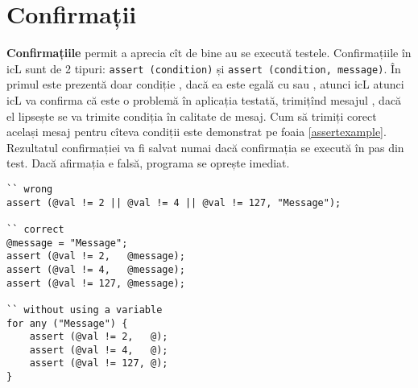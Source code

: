 \section{Confirmații}

{\bf Confirmațiile} permit a aprecia cît de bine au se execută testele. Confirmațiile în icL sunt de 2 tipuri: \lstinline|assert (condition)| și \lstinline|assert (condition, message)|. În primul este prezentă doar condiție , dacă ea este egală cu \false{} sau \void, atunci icL atunci icL va confirma că este o problemă în aplicația testată, trimițînd mesajul , dacă el lipsește se va trimite condiția în calitate de mesaj. Cum să trimiți corect același mesaj pentru cîteva condiții este demonstrat pe foaia \ref{assertexample}. Rezultatul confirmației va fi salvat numai dacă confirmația se execută în pas din test. Dacă afirmația e falsă, programa se oprește imediat.

\begin{lstlisting}[caption=Exemple de folosire a confirmațiilor, label=assertexample]
`` wrong
assert (@val != 2 || @val != 4 || @val != 127, "Message");

`` correct
@message = "Message";
assert (@val != 2,   @message);
assert (@val != 4,   @message);
assert (@val != 127, @message);

`` without using a variable
for any ("Message") {
	assert (@val != 2,   @);
	assert (@val != 4,   @);
	assert (@val != 127, @);
}
\end{lstlisting}
